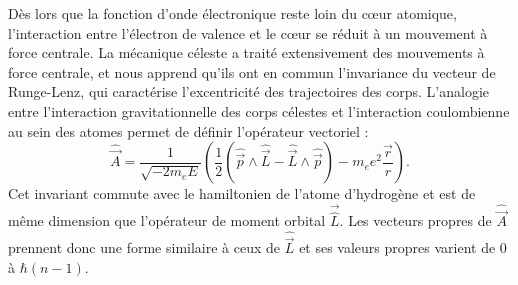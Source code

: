 Dès lors que la fonction d'onde électronique reste loin du c\oe ur atomique, l'interaction entre l'électron de valence et le c\oe ur se réduit à un mouvement à force centrale.
La mécanique céleste a traité extensivement des mouvements à force centrale, et nous apprend qu'ils ont en commun l'invariance du vecteur de Runge-Lenz, qui caractérise l'excentricité des trajectoires des corps.
%
L'analogie entre l'interaction gravitationnelle des corps célestes et l'interaction coulombienne au sein des atomes permet de définir l'opérateur vectoriel :
\begin{equation}\label{eq:RungeLenz}
\hat{\vec{A}} = \frac{1}{\sqrt{-2m_e E}} \left( \frac{1}{2} (\hat{\vec{p}}\wedge\hat{\vec{L}} - \hat{\vec{L}}\wedge\hat{\vec{p}}) - m_e e^2 \frac{\vec{r}}{r} \right).
\end{equation}
Cet invariant commute avec le hamiltonien de l'atome d'hydrogène et est de même dimension que l'opérateur de moment orbital $\vec{\hat{L}}$.
Les vecteurs propres de $\hat{\vec{A}}$ prennent donc une forme similaire à ceux de $\hat{\vec{L}}$ et ses valeurs propres varient de $0$ à $\hbar(n-1)$.

